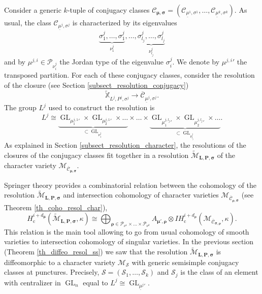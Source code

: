 \documentclass[JEP,XML,SOM,NoEqCountersInSection,Unicode,published]{cedram}
\newcommand{\rc}{\mathrm{c}}
\theoremstyle{definition}
\theoremstyle{plain}
\DeclareMathOperator{\GL}{GL}
\newcommand{\IH}{\mathit{IH}}
\newcommand{\Part}{\mathcal{P}}
\newcommand{\mlps}{\widetilde{\mathcal{M}}_{\boldsymbol{L},\boldsymbol{P},\boldsymbol{\sigma}}}
\begin{document}
Consider a generic $k$-tuple of conjugacy classes $\mathcal{C}_{\boldsymbol{\mu},\boldsymbol{\sigma}} =(\mathcal{C}_{\underline{\mu}^1,\sigma^1}, \dots, \mathcal{C}_{\underline{\mu}^k,\sigma^k})$. As usual, the class $\mathcal{C}_{\underline{\mu}^j,\sigma^j}$ is characterized by its eigenvalues
\[
\underbrace{\sigma^j_1,\dots,\sigma^j_1}_{\nu^j_1},\dots,\underbrace{\sigma^j_{l_j},\dots, \sigma^j_{l_j}}_{\nu^j_{l_j}}
\]
and by $\mu^{j,i}\in \Part_{\nu^j_i}$ the Jordan type of the eigenvalue $\sigma^{j}_i$. We denote by ${\mu^{j,i}}'$ the transposed partition. For each of these conjugacy classes, consider the resolution of the closure (see Section \ref{subsect_resolution_conjugacy})
\[
\mathbb{\widetilde{X}}_{L^j, P^j, \sigma^j}\to \overline{\mathcal{C}}_{\underline{\mu}^j,\sigma^j}.
\]
The group $L^j$ used to construct the resolution is
\[
L^j \cong \underbrace{\GL_{ {\mu^{j,1}_1}'}\times \GL_{{\mu^{j,1}_2}'} \times \dots }_{\subset \GL_{\nu^j_1}}\times \dots \times \underbrace{\GL_{{\mu^{j,l_j}_1}'}\times \GL_{{\mu^{j,l_j}_2}'} \times \dots}_{\subset \GL_{\nu^j_{l_j}}}.
\]
As explained in Section \ref{subsect_resolution_character}, the resolutions of the closures of the conjugacy classes fit together in a resolution $\mlps$ of the character variety $\mathcal{M}_{\overline{\mathcal{C}}_{\boldsymbol{\mu},\boldsymbol{\sigma}}}$.

Springer theory provides a combinatorial relation between the cohomology of the resolution $\mlps$ and intersection cohomology of character varieties $\mathcal{M}_{\overline{\mathcal{C}}_{\boldsymbol{\rho},\boldsymbol{\sigma}}}$ (see Theorem \ref{th_coho_resol_char}),
\begin{equation}\label{eq_relation_cohom_resol}
H^{i+d_{\boldsymbol{\mu}}}_\rc
(\mlps,\kappa)
\cong
\bigoplus_{\boldsymbol{\rho}\in \Part_{\nu^1}\times\dots\times \Part_{\nu^k}}
A_{\boldsymbol{\mu'},\boldsymbol{\rho}}\otimes
\IH_{\rc}^{i+d_{\boldsymbol{\rho}}}(\mathcal{M}_{\overline{\mathcal{C}}_{\boldsymbol{\sigma},\boldsymbol{\rho}}},\kappa).
\end{equation}
This relation is the main tool allowing to go from usual cohomology of smooth varieties to intersection cohomology of singular varieties. In the previous section (Theorem \ref{th_diffeo_resol_ss}) we saw that the resolution $\mlps$ is diffeomorphic to a character variety $\mathcal{M}_{\boldsymbol{\mathcal{S}}}$ with generic semisimple conjugacy classes at punctures. Precisely, $\boldsymbol{\mathcal{S}}=\left(\mathcal{S}_1,\dots,\mathcal{S}_k\right)$ and $\mathcal{S}_j$ is the class of an element with centralizer in $\GL_n$ equal to $L^j\cong \GL_{{\underline{\mu}^j}'}$.
\end{document}
